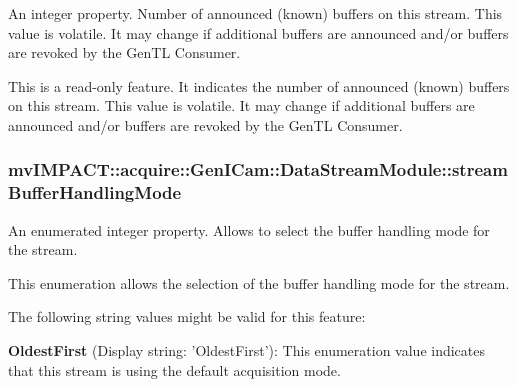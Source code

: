 An integer property. Number of announced (known) buffers on this stream. This value is volatile. It may change if additional buffers are announced and/or buffers are revoked by the Gen\+T\+L Consumer. 

This is a read-\/only feature. It indicates the number of announced (known) buffers on this stream. This value is volatile. It may change if additional buffers are announced and/or buffers are revoked by the Gen\+T\+L Consumer. \hypertarget{classmv_i_m_p_a_c_t_1_1acquire_1_1_gen_i_cam_1_1_data_stream_module_a4641a6c84bb270821225acc34cc106ac}{
\subsubsection[{stream\+Buffer\+Handling\+Mode}]{ mv\+I\+M\+P\+A\+C\+T\+::acquire\+::\+Gen\+I\+Cam\+::\+Data\+Stream\+Module\+::stream\+Buffer\+Handling\+Mode}}\label{classmv_i_m_p_a_c_t_1_1acquire_1_1_gen_i_cam_1_1_data_stream_module_a4641a6c84bb270821225acc34cc106ac}


An enumerated integer property. Allows to select the buffer handling mode for the stream. 

This enumeration allows the selection of the buffer handling mode for the stream.

The following string values might be valid for this feature\+:
\begin{DoxyItemize}
\item {\bfseries Oldest\+First} (Display string\+: 'Oldest\+First')\+: This enumeration value indicates that this stream is using the default acquisition mode.
\end{DoxyItemize}


